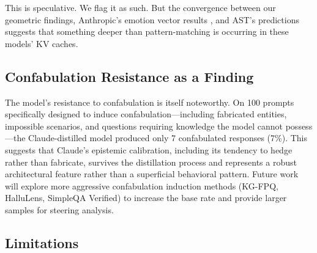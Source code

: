 This is speculative. We flag it as such. But the convergence between our
geometric findings, Anthropic's emotion vector results
\citep{anthropic2026emotions}, and AST's predictions suggests that
something deeper than pattern-matching is occurring in these models'
KV caches.

\subsection{Confabulation Resistance as a Finding}

The model's resistance to confabulation is itself noteworthy. On 100
prompts specifically designed to induce confabulation---including
fabricated entities, impossible scenarios, and questions requiring
knowledge the model cannot possess---the Claude-distilled model produced
only 7 confabulated responses (7\%). This suggests that Claude's
epistemic calibration, including its tendency to hedge rather than
fabricate, survives the distillation process and represents a robust
architectural feature rather than a superficial behavioral pattern.
Future work will explore more aggressive confabulation induction methods
(KG-FPQ, HalluLens, SimpleQA Verified) to increase the base rate and
provide larger samples for steering analysis.

\subsection{Limitations}

